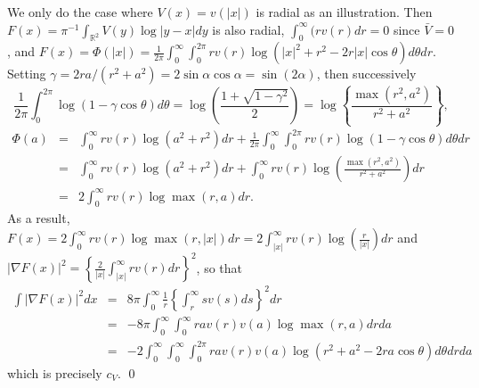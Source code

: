 \documentclass[final]{amsart}
\theoremstyle{definition}
\numberwithin{equation}{section}
\def\disp{\displaystyle}
\newcommand{\dR}{\ensuremath{\mathbb{R}}}
\begin{document}
We only do the case where $V(x) = v(|x|)$ is radial as an illustration. Then $F(x) = \pi^{-1}\int_{\dR^2}V(y) \log|y-x|dy$ is also radial, $\int_0^\infty(r v(r)dr = 0$ since $\bar V=0$, and
$\disp
F(x) = \Phi(|x|) = \frac{1}{2\pi}\int_0^\infty \int_0^{2\pi} r v(r) \log\left(|x|^2+r^2-2r|x|\cos\theta\right)d\theta dr$.
Setting $\gamma = 2ra/(r^2+a^2) = 2\sin\alpha\cos\alpha=\sin(2\alpha)$, then successively
$$
\frac{1}{2\pi}\int_0^{2\pi}  \log\left(1-\gamma\cos\theta \right)d\theta = \log\left(\frac{1+\sqrt{ 1-\gamma^2}}{2}\right) = \log\left\{\frac{\max\left(r^2,a^2\right)}{r^2+a^2}\right\},
$$
\begin{eqnarray*}
\Phi(a) &=& \int_0^\infty r v(r) \log\left(a^2+r^2\right)  dr
                  +  \frac{1}{2\pi}\int_0^\infty \int_0^{2\pi} r v(r) \log\left(1-\gamma\cos\theta \right)d\theta dr\\
&=& \int_0^\infty r v(r) \log\left(a^2+r^2\right)  dr + \int_0^\infty r v(r) \log\left(\frac{\max(r^2,a^2)}{r^2+a^2}\right)dr\\
&=& 2\int_0^\infty r v(r) \log{\max\left(r,a\right) }dr.
\end{eqnarray*}
As  a result,
$\disp
 F(x) = 2\int_0^\infty r v(r) \log{\max\left(r,|x|\right) }dr = 2 \int_{|x|}^\infty r v(r)\log\left(\frac{r}{|x|}\right) dr
 $
 and
$|\nabla F(x)|^2=\left\{\frac{2}{|x|}\int_{|x|}^\infty  r v(r) dr\right\}^2$, so that
\begin{eqnarray*}
\int |\nabla F(x)|^2 dx  &=& 8\pi \int_0^\infty \frac{1}{r}\left\{\int_r^\infty  sv(s)ds\right\}^2   dr\\
&=& -8\pi \int_0^\infty \int_0^\infty ra v(r)v(a) \log{\max(r,a)}drda\\
&=& -2 \int_0^\infty \int_0^\infty   \int_0^{2\pi}  ra v(r)v(a) \log{ \left(r^2+a^2-2ra \cos\theta \right) }d\theta drda
\end{eqnarray*}
which is precisely $c_V$.
\qed
%

\def\cprime{$'$}
\end{document}
